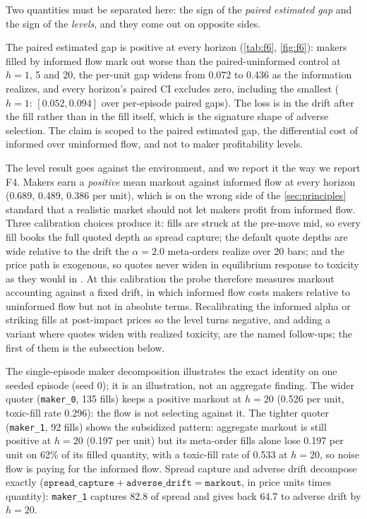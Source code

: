 Two quantities must be separated here: the sign of the \emph{paired estimated gap} and the sign of the \emph{levels}, and they come out on opposite sides.

The paired estimated gap is positive at every horizon (\cref{tab:f6}, \cref{fig:f6}): makers filled by informed flow mark out worse than the paired-uninformed control at $h = 1$, 5 and 20, the per-unit gap widens from 0.072 to 0.436 as the information realizes, and every horizon's paired CI excludes zero, including the smallest ($h = 1$: $[0.052, 0.094]$ over per-episode paired gaps). The loss is in the drift after the fill rather than in the fill itself, which is the signature shape of adverse selection. The claim is scoped to the paired estimated gap, the differential cost of informed over uninformed flow, and not to maker profitability levels.

The level result goes against the environment, and we report it the way we report F4. Makers earn a \emph{positive} mean markout against informed flow at every horizon (0.689, 0.489, 0.386 per unit), which is on the wrong side of the \cref{sec:principles} standard that a realistic market should not let makers profit from informed flow. Three calibration choices produce it: fills are struck at the pre-move mid, so every fill books the full quoted depth as spread capture; the default quote depths are wide relative to the drift the $\alpha = 2.0$ meta-orders realize over 20 bars; and the price path is exogenous, so quotes never widen in equilibrium response to toxicity as they would in \citet{glosten1985bid}. At this calibration the probe therefore measures markout accounting against a fixed drift, in which informed flow costs makers relative to uninformed flow but not in absolute terms. Recalibrating the informed alpha or striking fills at post-impact prices so the level turns negative, and adding a variant where quotes widen with realized toxicity, are the named follow-ups; the first of them is the subsection below.

The single-episode maker decomposition illustrates the exact identity on one seeded episode (seed 0); it is an illustration, not an aggregate finding. The wider quoter (\texttt{maker\_0}, 135 fills) keeps a positive markout at $h = 20$ (0.526 per unit, toxic-fill rate 0.296): the flow is not selecting against it. The tighter quoter (\texttt{maker\_1}, 92 fills) shows the subsidized pattern: aggregate markout is still positive at $h = 20$ (0.197 per unit) but its meta-order fills alone lose 0.197 per unit on 62\% of its filled quantity, with a toxic-fill rate of 0.533 at $h = 20$, so noise flow is paying for the informed flow. Spread capture and adverse drift decompose exactly ($\texttt{spread\_capture} + \texttt{adverse\_drift} = \texttt{markout}$, in price units times quantity): \texttt{maker\_1} captures 82.8 of spread and gives back 64.7 to adverse drift by $h = 20$.

